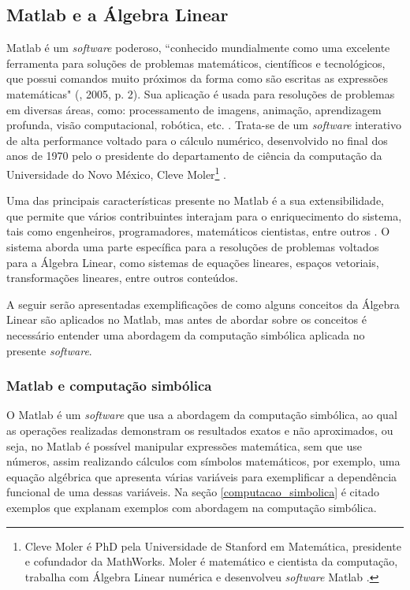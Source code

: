 \subsection{Matlab e a Álgebra Linear}
\label{matlab_alebra_linear}
\noindent Matlab é um \textit{software} poderoso, ``conhecido mundialmente como uma excelente ferramenta para soluções de problemas matemáticos, científicos e tecnológicos, que possui comandos muito próximos da forma como são escritas as expressões matemáticas"  (\cite{2005:Marcello}, 2005, p. 2). Sua aplicação é usada para resoluções de problemas em diversas áreas, como: processamento de imagens, animação, aprendizagem profunda, visão computacional, robótica, etc. \cite{2004:Wu}. Trata-se de um \textit{software} interativo de alta performance voltado para o cálculo numérico, desenvolvido no final dos anos de 1970 pelo o presidente do departamento de ciência da computação da Universidade do Novo México, Cleve Moler\footnote[1]{Cleve Moler é PhD pela Universidade de Stanford em Matemática, presidente e cofundador da MathWorks. Moler é matemático e cientista da computação, trabalha com Álgebra Linear numérica e desenvolveu \textit{software} Matlab \cite{2016:Raquel}.} \cite{2016:Raquel}.

Uma das principais características presente no Matlab é a sua extensibilidade, que permite que vários contribuintes interajam  para o enriquecimento do sistema, tais como engenheiros, programadores, matemáticos cientistas, entre outros \cite{2005:Marcello}. O sistema aborda uma parte específica para a resoluções de problemas voltados para a Álgebra Linear, como sistemas de equações lineares, espaços vetoriais, transformações lineares, entre outros conteúdos.

A seguir serão apresentadas exemplificações de como alguns conceitos da Álgebra Linear são aplicados no Matlab, mas antes de abordar sobre os conceitos é necessário entender uma abordagem da computação simbólica aplicada no presente \textit{software}.

\subsubsection{Matlab e computação simbólica}
\label{matlab_computacao_simbolica}
\noindent O Matlab é um \textit{software} que usa a abordagem da computação simbólica, ao qual as operações realizadas demonstram os resultados exatos e não aproximados, ou seja, no Matlab é possível manipular expressões matemática, sem que use números, assim realizando cálculos com símbolos matemáticos, por exemplo, uma equação algébrica que apresenta várias variáveis para exemplificar a dependência funcional de uma dessas variáveis. Na seção \ref{computacao_simbolica} é citado exemplos que explanam exemplos com abordagem na computação simbólica.

